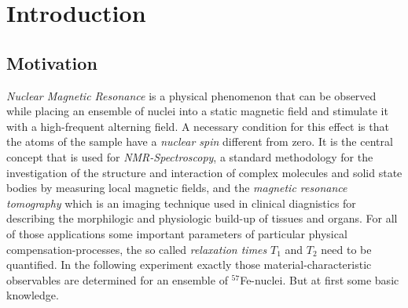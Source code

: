 \section{Introduction}
	\subsection{Motivation}
		\textit{Nuclear Magnetic Resonance} is a physical phenomenon that can be observed while placing an ensemble of nuclei into a static magnetic field and stimulate it with a high-frequent alterning field. A necessary condition for this effect is that the atoms of the sample have a \textit{nuclear spin} different from zero. It is the central concept that is used for \textit{NMR-Spectroscopy}, a standard methodology for the investigation of the structure and interaction of complex molecules and solid state bodies by measuring local magnetic fields, and the \textit{magnetic resonance tomography} which is an imaging technique used in clinical diagnistics for describing the morphilogic and physiologic build-up of tissues and organs. For all of those applications some important parameters of particular physical compensation-processes, the so called \textit{relaxation times} $T_1$ and $T_2$ need to be quantified. In the following experiment exactly those material-characteristic observables are determined for an ensemble of $^{57}$Fe-nuclei. But at first some basic knowledge.
